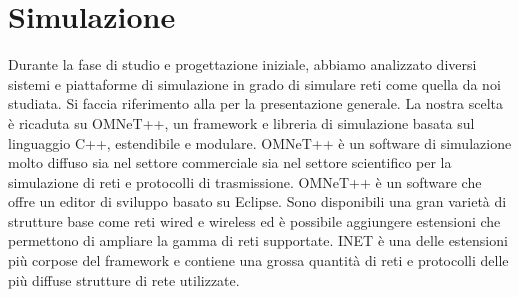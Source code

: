 \section{Simulazione}
Durante la fase di studio e progettazione iniziale, abbiamo analizzato diversi sistemi e piattaforme di simulazione in grado di simulare reti come quella da noi studiata. Si faccia riferimento alla  per la presentazione generale. La nostra scelta è ricaduta su OMNeT++, un framework e libreria di simulazione basata sul linguaggio C++, estendibile e modulare. OMNeT++ è un software di simulazione molto diffuso sia nel settore commerciale sia nel settore scientifico per la simulazione di reti e protocolli di trasmissione. OMNeT++ è un software che offre un editor di sviluppo basato su Eclipse. Sono disponibili una gran varietà di strutture base come reti wired e wireless ed è possibile aggiungere estensioni che permettono di ampliare la gamma di reti supportate. INET è una delle estensioni più corpose del framework e contiene una grossa quantità di reti e protocolli delle più diffuse strutture di rete utilizzate.

